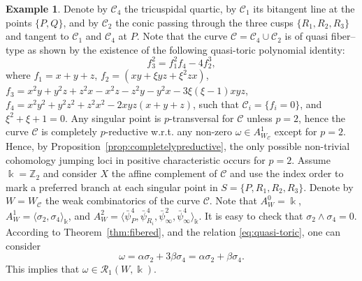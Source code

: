 \documentclass[11pt]{amsart}
\def\cC{\mathcal{C}}
\def\cR{{\mathcal R}}
\def\ZZ{\mathbb{Z}}
\def\kk{\Bbbk}
\def\w{\omega}
\theoremstyle{plain}
\theoremstyle{definition}
\newtheorem{example}[thm]{Example}
\begin{document}
\begin{example}
\label{ex:TCQuartic1}
Denote by $\cC_4$ the tricuspidal quartic, by $\cC_1$ its bitangent line at the points $\{P,Q\}$, and by $\cC_2$ the conic passing through the three cusps $\{R_1,R_2,R_3\}$ and tangent to $\cC_1$ and $\cC_4$ at $P$. Note that the curve $\cC=\cC_4\cup\cC_2$ is of quasi fiber--type as shown by the existence of the following quasi-toric polynomial identity:
\begin{equation}
\label{eq:quasi-toric}
f_3^2=f_1^2f_4-4f_2^3,
\end{equation}
where $f_1=x+y+z$, 
$f_2=(xy+\xi yz+\xi^2zx)$,
$f_3=x^2y+y^2z+z^2x-x^2z-z^2y-y^2x-3\xi(\xi-1)xyz$,
$f_4=x^2y^2+y^2z^2+z^2x^2-2xyz(x+y+z)$, 
such that $\cC_i=\{f_i=0\}$, and $\xi^2+\xi+1=0$.
Any singular point is $p$-transversal for $\cC$ unless $p=2$, hence the curve $\cC$ is completely $p$-reductive w.r.t. any non-zero $\w\in A^1_{W_\cC}$ except for $p=2$. Hence, by Proposition~\ref{prop:completelypreductive}, the only possible non-trivial cohomology jumping loci in positive characteristic occurs for $p=2$.
Assume $\kk=\ZZ_2$ and consider $X$ the affine complement of $\cC$ and use the index order to mark a preferred branch at each singular point in $S=\{P,R_1,R_2,R_3\}$.  Denote by $W=W_\cC$ the weak combinatorics of the curve $\cC$.
Note that
$A^0_W=\kk$, $A^1_W=\langle \sigma_2,\sigma_4\rangle_\kk$, and
$A^2_W=\langle\bar\psi_P^4,\bar\psi_{R_i}^4,
\bar\psi_{\infty}^2,\bar\psi_{\infty}^4\rangle_\kk.$
It is easy to check that $\sigma_2\wedge\sigma_4=0$.
According to Theorem~\ref{thm:fibered}, and the relation \eqref{eq:quasi-toric}, one can consider
$$
\omega = \alpha\sigma_2+3\beta\sigma_4=\alpha\sigma_2+\beta\sigma_4.
$$ 
This implies that $\omega\in \cR_1(W,\kk)$.
\end{example}
\end{document}
